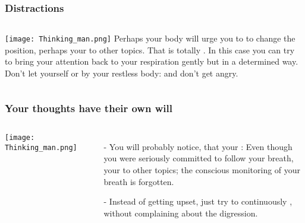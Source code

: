 
\begin{frame}
\frametitle{Distractions}
\begin{columns}[c] %

\texttt{[image: Thinking\_man.png]}
Perhaps your body will urge you to to change the position, perhaps your  to other topics.
That is totally . In this case you can try to bring your attention back to your respiration gently but in a determined way. Don't let yourself  or by your restless body:  and don't get angry.
\end{columns}
\end{frame}

\begin{frame}
\frametitle{Your thoughts have their own will}
\begin{columns}[c] %

\texttt{[image: Thinking\_man.png]}
\begin{itemize}
\item[-]You will probably notice, that your : Even though you were seriously committed to follow your breath, your  to other topics; the conscious monitoring of your breath is forgotten. 
\item[-]Instead of getting upset, just try to continuously , without complaining about the digression. 
\end{itemize}
\end{columns}
\end{frame}


